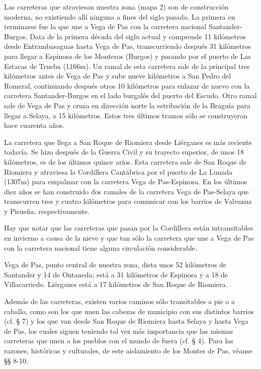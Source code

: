 \documentclass[11pt,spanish,b5paper]{book}
\begin{document}
Las carreteras que atraviesan nuestra zona (mapa 2) son de construcción moderna, no existiendo allí ninguna a fines del siglo pasado. La primera en terminarse fue la que une a Vega de Pas con la carretera nacional Santander-Burgos. Data de la primera década del siglo actual y comprende 11 kilómetros desde Entrambasaguas hasta Vega de Pas, transcurriendo después 31 kilómetros para llegar a Espinosa de los Monteros (Burgos) y pasando por el puerto de Las Estacas de Trueba (1166m). Un ramal de esta carretera sale de la principal tres kilómetros antes de Vega de Pas y sube nueve kilómetros a San Pedro del Romeral, continuando después otros 10 kilómetros para enlazar de nuevo con la carretera Santander-Burgos en el lado burgalés del puerto del Escudo. Otro ramal sale de Vega de Pas y cruza en dirección norte la estribación de la Braguía para llegar a Selaya, a 15 kilómetros. Estos tres últimos tramos sólo se construyeron hace cuarenta años. 

La carretera que llega a San Roque de Riomiera desde Liérganes es más reciente todavía. Se hizo después de la Guerra Civil y su trayecto superior, de unos 18 kilómetros, es de los últimos quince arios. Esta carretera sale de San Roque de Riomiera y atraviesa la Cordillera Cantábrica por el puerto de La Lunada (1307m) para empalmar con la carretera Vega de Pas-Espinosa.
En los últimos diez años se han construido dos ramales de la carretera Vega de Pas-Selaya que transcurren tres y cuatro kilómetros para comunicar con los barrios de Valvanuz y Pisueña, respectivamente.

Hay que notar que las carreteras que pasan por la Cordillera están intransitables en invierno a causa de la nieve y que tan sólo la carretera que une a Vega de Pas con la carretera nacional tiene alguna circulación considerable.

Vega de Pas, punto central de nuestra zona, dista unos 52 kilómetros de Santander y 14 de Ontaneda; está a 31 kilómetros de Espinosa y a 18 de Villacarriedo. Liérganes está a 17 kilómetros de San Roque de Riomiera.

Además de las carreteras, existen varios caminos sólo transitables a pie o a caballo, como son los que unen las cabezas de municipio con sus distintos barrios (cf. § 7) y los que van desde San Roque de Riomiera hasta Selaya y hasta Vega de Pas, los cuales siguen teniendo tal vez
más importancia que las mismas carreteras que unen a los pueblos con el mundo de fuera (cf. § 4). Para las razones, históricas y culturales, de este aislamiento de los Montes de Pas, véanse §§ 8-10.
\end{document}
